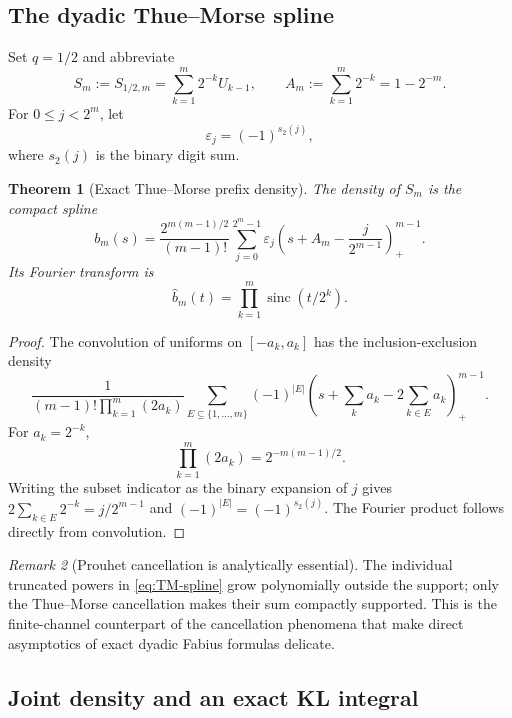 \documentclass[11pt,oneside]{article}
\newtheorem{theorem}{Theorem}[section]
\theoremstyle{definition}
\theoremstyle{remark}
\newtheorem{remark}[theorem]{Remark}
\newcommand{\sinc}{\operatorname{sinc}}
\newcommand{\pospart}[1]{\left(#1\right)_{+}}
\newcommand{\epsTM}{\varepsilon}
\begin{document}
\subsection{The dyadic Thue--Morse spline}

Set $q=1/2$ and abbreviate
\begin{equation}
 S_m:=S_{1/2,m}=\sum_{k=1}^{m}2^{-k}U_{k-1},
 \qquad A_m:=\sum_{k=1}^{m}2^{-k}=1-2^{-m}.
 \label{eq:dyadic-prefix}
\end{equation}
For $0\le j<2^m$, let
\begin{equation}
 \epsTM_j=(-1)^{s_2(j)},
 \label{eq:TM-sign}
\end{equation}
where $s_2(j)$ is the binary digit sum.

\begin{theorem}[Exact Thue--Morse prefix density]
\label{thm:TM-spline}
The density of $S_m$ is the compact spline
\begin{equation}
 \boxed{
 b_m(s)=\frac{2^{m(m-1)/2}}{(m-1)!}
 \sum_{j=0}^{2^m-1}\epsTM_j
 \pospart{s+A_m-\frac{j}{2^{m-1}}}^{m-1}.}
 \label{eq:TM-spline}
\end{equation}
Its Fourier transform is
\begin{equation}
 \widehat b_m(t)=\prod_{k=1}^{m}\sinc(t/2^k).
 \label{eq:dyadic-finite-sinc}
\end{equation}
\end{theorem}

\begin{proof}
The convolution of uniforms on $[-a_k,a_k]$ has the inclusion-exclusion density
\[
 \frac{1}{(m-1)!\prod_{k=1}^{m}(2a_k)}
 \sum_{E\subseteq\{1,\ldots,m\}}(-1)^{|E|}
 \pospart{s+\sum_ka_k-2\sum_{k\in E}a_k}^{m-1}.
\]
For $a_k=2^{-k}$,
\[
 \prod_{k=1}^{m}(2a_k)=2^{-m(m-1)/2}.
\]
Writing the subset indicator as the binary expansion of $j$ gives
$2\sum_{k\in E}2^{-k}=j/2^{m-1}$ and $(-1)^{|E|}=(-1)^{s_2(j)}$.
The Fourier product follows directly from convolution.
\end{proof}

\begin{remark}[Prouhet cancellation is analytically essential]
The individual truncated powers in \eqref{eq:TM-spline} grow polynomially outside
the support; only the Thue--Morse cancellation makes their sum compactly
supported.  This is the finite-channel counterpart of the cancellation phenomena
that make direct asymptotics of exact dyadic Fabius formulas delicate.
\end{remark}

\subsection{Joint density and an exact KL integral}
\end{document}
